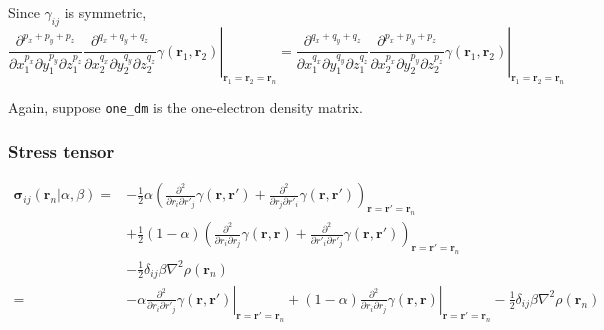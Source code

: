 \documentclass[letterpaper]{article}
\begin{document}
Since $\gamma_{ij}$ is symmetric,
\begin{equation}
  \left.
    \frac{\partial^{p_x + p_y + p_z}}{\partial x_1^{p_x} \partial y_1^{p_y} \partial z_1^{p_z}}
    \frac{\partial^{q_x + q_y + q_z}}{\partial x_2^{q_x} \partial y_2^{q_y} \partial z_2^{q_z}}
    \gamma(\mathbf{r}_1, \mathbf{r}_2)
  \right|_{\mathbf{r}_1 = \mathbf{r}_2 = \mathbf{r}_n} =
  \left.
    \frac{\partial^{q_x + q_y + q_z}}{\partial x_1^{q_x} \partial y_1^{q_y} \partial z_1^{q_z}}
    \frac{\partial^{p_x + p_y + p_z}}{\partial x_2^{p_x} \partial y_2^{p_y} \partial z_2^{p_z}}
    \gamma(\mathbf{r}_1, \mathbf{r}_2)
  \right|_{\mathbf{r}_1 = \mathbf{r}_2 = \mathbf{r}_n}
\end{equation}

Again, suppose \verb|one_dm| is the one-electron density matrix.
\subsubsection{Stress tensor}
\begin{equation}
  \begin{split}
    \boldsymbol{\sigma}_{ij}(\mathbf{r}_n | \alpha, \beta)
    =&
    -\frac{1}{2} \alpha
    \left(
      \frac{\partial^2}{\partial r_i \partial r'_j} \gamma(\mathbf{r}, \mathbf{r}')
      + \frac{\partial^2}{\partial r_j \partial r'_i} \gamma(\mathbf{r}, \mathbf{r}')
    \right)_{\mathbf{r} = \mathbf{r}' = \mathbf{r}_n}\\
    & +\frac{1}{2} (1 - \alpha)
    \left(
      \frac{\partial^2}{\partial r_i \partial r_j} \gamma(\mathbf{r}, \mathbf{r})
      + \frac{\partial^2}{\partial r'_i \partial r'_j} \gamma(\mathbf{r}, \mathbf{r}')
    \right)_{\mathbf{r} = \mathbf{r}' = \mathbf{r}_n}\\
    & - \frac{1}{2} \delta_{ij} \beta \nabla^2 \rho(\mathbf{r}_n)\\
    =&
    - \alpha
    \left.
      \frac{\partial^2}{\partial r_i \partial r'_j} \gamma(\mathbf{r}, \mathbf{r}')
    \right|_{\mathbf{r} = \mathbf{r}' = \mathbf{r}_n}
    + (1 - \alpha)
    \left.
      \frac{\partial^2}{\partial r_i \partial r_j} \gamma(\mathbf{r}, \mathbf{r})
    \right|_{\mathbf{r} = \mathbf{r}' = \mathbf{r}_n}
    - \frac{1}{2} \delta_{ij} \beta \nabla^2 \rho(\mathbf{r}_n)\\
  \end{split}
\end{equation}
\end{document}
